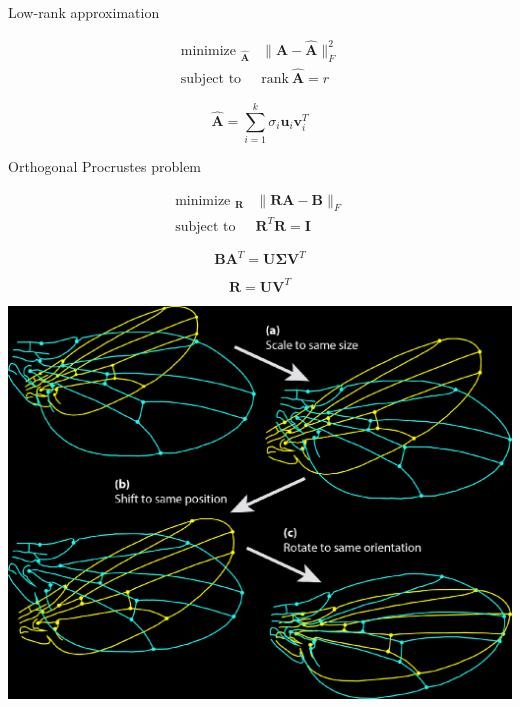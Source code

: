 \documentclass[aspectratio=169]{beamer}
\DeclareMathOperator*{\minimize}{minimize~}
\DeclareMathOperator*{\subto}{subject~to~}
\begin{document}
\begin{frame}{Low-rank approximation}
  \vfill

  \begin{minipage}{.48\textwidth}
    \begin{overprint}
      \Large
      \[
      \begin{aligned}
        \minimize_{\hat{\bm{A}}} & \| \bm{A} - \hat{\bm{A}} \|_F^2 \\
        \subto & \mathrm{rank~} \hat{\bm{A}} = r
      \end{aligned}
      \]

      \Large
      \[
      \hat{\bm{A}} = \sum_{i=1}^k \sigma_i \bm{u}_i \bm{v}_i^T
      \]
    \end{overprint}
  \end{minipage}%
  \hfill
  \begin{minipage}{.48\textwidth}
  \end{minipage}

  \vfill
\end{frame}

\begin{frame}{Orthogonal Procrustes problem}
  \vfill
  \begin{minipage}{.48\textwidth}
    \begin{overprint}
      \large
      \[
      \begin{aligned}
        \minimize_{\bm{R}} & \| \bm{RA} - \bm{B} \|_F \\
        \subto & \bm{R}^T \bm{R} = \bm{I}
      \end{aligned}
      \]

      \large
      \[
      \bm{BA}^T = \bm{U} \boldsymbol{\Sigma} \bm{V}^T
      \]

      \large
      \[
      \bm{R} = \bm{UV}^T
      \]

    \end{overprint}
  \end{minipage}%
  \hfill
  \begin{minipage}{.48\textwidth}
    \includegraphics[width=\textwidth]{procrustes}
  \end{minipage}
  \vfill
\end{frame}
\end{document}
